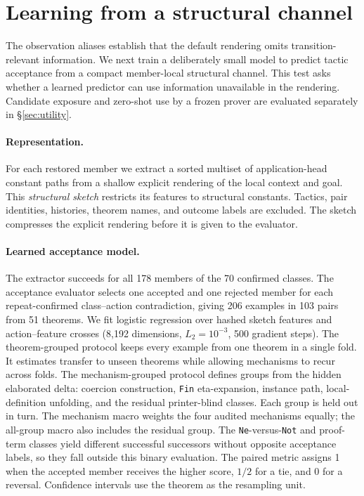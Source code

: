 \documentclass[11pt]{article}
\begin{document}
\section{Learning from a structural channel}
\label{sec:representation}

The observation aliases establish that the default rendering omits
transition-relevant information. We next train a deliberately small model to
predict tactic acceptance from a compact member-local structural channel. This
test asks whether a learned predictor can use information unavailable in the
rendering. Candidate exposure and zero-shot use by a frozen prover are evaluated
separately in \S\ref{sec:utility}.

\paragraph{Representation.}
For each restored member we extract a sorted multiset of application-head
constant paths from a shallow explicit rendering of the local context and
goal. This \emph{structural sketch} restricts its features to structural
constants. Tactics, pair identities, histories, theorem names, and outcome
labels are excluded. The sketch compresses the explicit rendering before it is
given to the evaluator.

\paragraph{Learned acceptance model.}
The extractor succeeds for all 178 members of the 70 confirmed classes. The
acceptance evaluator selects one accepted and one rejected member for each
repeat-confirmed class--action contradiction, giving 206 examples in 103 pairs
from 51 theorems. We fit logistic regression over hashed sketch features and
action--feature crosses (8{,}192 dimensions, $L_2{=}10^{-3}$, 500 gradient
steps). The theorem-grouped protocol keeps every example from one theorem in a
single fold. It estimates transfer to unseen theorems while allowing mechanisms
to recur across folds. The mechanism-grouped protocol defines groups from the
hidden elaborated delta: coercion construction, \texttt{Fin} eta-expansion,
instance path, local-definition unfolding, and the residual printer-blind
classes. Each group is held out in turn. The mechanism macro weights the four
audited mechanisms equally; the all-group macro also includes the residual
group.
The \texttt{Ne}-versus-\texttt{Not} and proof-term classes yield
different successful successors without opposite acceptance labels, so they
fall outside this binary evaluation. The paired metric assigns 1 when the
accepted member receives the higher score, $1/2$ for a tie, and 0 for a
reversal. Confidence intervals use the theorem as the resampling unit.
\end{document}
